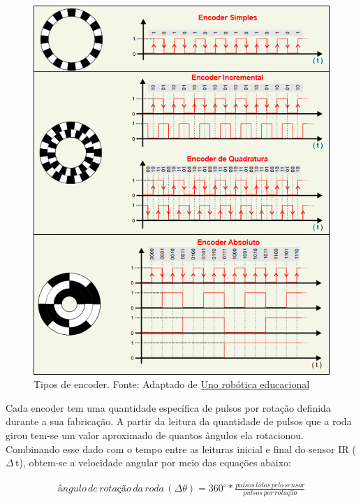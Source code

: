 \begin{enumerate}
          \begin{figure}[h]
            \centering
            \includegraphics[scale=.4]{figuras/encoders.png}
            \caption{Tipos de encoder. Fonte: Adaptado de \href{http://www.unorobotica.com.br/docs/encoder.pdf}{Uno robótica educacional}}
            \label{4encoders}
          \end{figure}

          Cada encoder tem uma quantidade específica de pulsos por rotação definida durante a sua fabricação. A partir da leitura da quantidade de pulsos que a roda girou tem-se um valor aproximado de quantos ângulos ela rotacionou. Combinando esse dado com o tempo entre as leituras inicial e final do sensor IR ($\Delta$\,t), obtem-se a velocidade angular por meio das equações abaixo:

          \begin{eqnarray} 
            \label{eq2}
            ângulo\,de\,rotação\,da\,roda\, (\Delta\theta)=360^{\circ}* \frac{pulsos\,lidos\,pelo\,sensor}{pulsos\,por\,rotação} 
          \end{eqnarray}


\end{enumerate}
